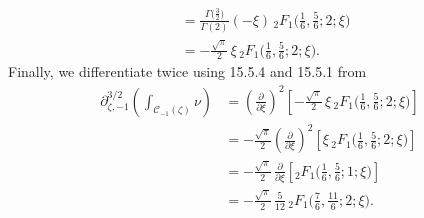 \documentclass{article}
\newcommand{\fracderiv}[3]{\partial^{#1}_{#2, #3}}
\theoremstyle{definition}
\theoremstyle{plain}
\newenvironment{old}{\color{RoyalBlue}}{\color{black}}
\begin{document}
\begin{old}
\begin{align*}
& =  \frac{\Gamma\big(\tfrac{3}{2}\big)}{\Gamma(2)} (-\xi)\, {}_2F_1\big(\tfrac{1}{6}, \tfrac{5}{6}; 2; \xi\big) \\
& = - \tfrac{\sqrt{\pi}}{2}\,\xi\,{}_2F_1\big(\tfrac{1}{6}, \tfrac{5}{6}; 2; \xi\big).
\end{align*}
Finally, we differentiate twice using 15.5.4 and 15.5.1 from \cite{dlmf}
\begin{align*}
\fracderiv{3/2}{\zeta}{-1} \left( \int_{\mathcal{C}_{-1}(\zeta)} \nu \right) & = \left(\tfrac{\partial}{\partial \xi}\right)^2 \left[ - \tfrac{\sqrt{\pi}}{2} \,\xi\, {}_2F_1\big(\tfrac{1}{6}, \tfrac{5}{6}; 2; \xi\big) \right] \\
& = - \tfrac{\sqrt{\pi}}{2} \left(\tfrac{\partial}{\partial \xi}\right)^2 \left[ \xi\, {}_2F_1\big(\tfrac{1}{6}, \tfrac{5}{6}; 2; \xi\big) \right] \\
& = - \tfrac{\sqrt{\pi}}{2}\,\tfrac{\partial}{\partial \xi} \left[ {}_2F_1\big(\tfrac{1}{6}, \tfrac{5}{6}; 1; \xi\big) \right] \\
& = - \tfrac{\sqrt{\pi}}{2}\,\tfrac{5}{12}\, {}_2F_1\big(\tfrac{7}{6}, \tfrac{11}{6}; 2; \xi\big).
\end{align*}
\end{old}
\end{document}
